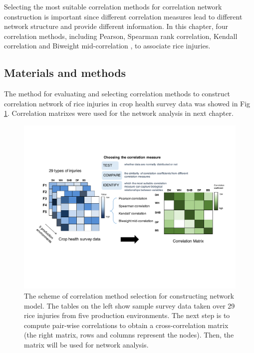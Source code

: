 Selecting the most suitable correlation methods for correlation network construction is important since different correlation measures lead to different network structure and provide different information. In this chapter, four correlation methods, including Pearson, Spearman rank correlation, Kendall correlation \citep{Prokhorov_2001_Kendall} and Biweight mid-correlation \citep{Wilcox_2012_Introduction}, to associate rice injuries. 
 
\newpage
\subsection{Materials and methods}

The method for evaluating and selecting correlation methods to construct correlation network of rice injuries in crop health survey data was showed in Fig \ref{fig:pipeline1}. Correlation matrixes were used for the network analysis in next chapter.

\begin{figure}[!htbp]
    \centering
     \includegraphics[width = 1\textwidth]{figures/pipeline1.pdf}
    \caption[The scheme of correlation method selection for constructing network model.]{The scheme of correlation method selection for constructing network model. The tables on the left show sample survey data taken over 29 rice injuries from five production environments. The next step is to compute pair-wise correlations to obtain a cross-correlation matrix (the right matrix, rows and columns represent the nodes). Then, the matrix will be used for network analysis.}
    \label{fig:pipeline1}
\end{figure}

